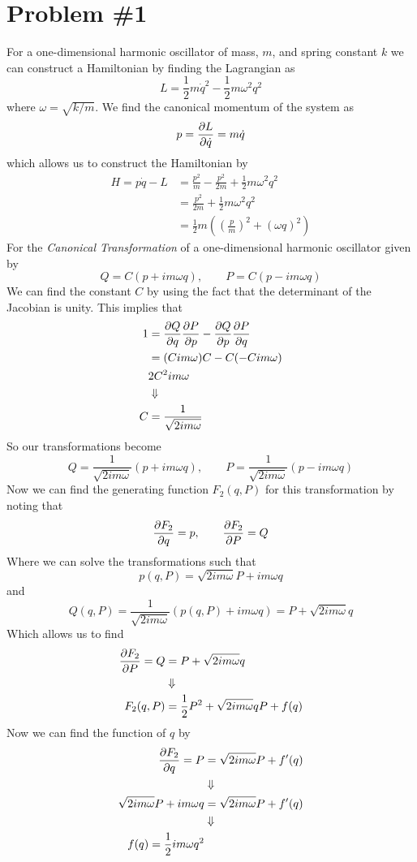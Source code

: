 \documentclass[11pt]{article}
\numberwithin{equation}{section}
\begin{document}


\section{Problem \#1}
For a one-dimensional harmonic oscillator of mass, $m$, and spring constant $k$ we can 
construct a Hamiltonian by finding the Lagrangian as
$$L = \frac{1}{2}m\dot{q}^2 - \frac{1}{2}m\omega^2q^2$$
where $\omega = \sqrt{k/m}$. We find the canonical momentum of the system as
$$p = \frac{\partial{L}}{\partial{\dot{q}}} = m\dot{q}$$
which allows us to construct the Hamiltonian by
\begin{align*}
H = p\dot{q} - L  &= \frac{p^2}{m} - \frac{p^2}{2m} + \frac{1}{2}m\omega^2q^2\\
&= \frac{p^2}{2m} + \frac{1}{2}m\omega^2q^2\\
&= \frac{1}{2}m\left(\left(\frac{p}{m}\right)^2 + (\omega{q})^2\right)
\end{align*}
For the \emph{Canonical Transformation} of a one-dimensional harmonic oscillator given by
$$Q = C(p+im\omega{q}), \qquad P = C(p-im\omega{q})$$
We can find the constant $C$ by using the fact that the determinant of the Jacobian is unity. 
This implies that
\begin{align*}
1 &= \frac{\partial{Q}}{\partial{q}}\frac{\partial{P}}{\partial{p}} - \frac{\partial{Q}}{\partial{p}}\frac{\partial{P}}{\partial{q}}\\
&= (Cim\omega)C - C(-Cim\omega)\\
& 2C^2im\omega\\
&\Downarrow\\
C &= \frac{1}{\sqrt{2im\omega}}
\end{align*}
So our transformations become
$$Q = \frac{1}{\sqrt{2im\omega}}(p+im\omega{q}), \qquad P = \frac{1}{\sqrt{2im\omega}}(p-im\omega{q})$$
Now we can find the generating function $F_2(q,P)$ for this transformation by noting that
$$\frac{\partial{F_2}}{\partial{q}} = p, \qquad \frac{\partial{F_2}}{\partial{P}} = Q$$
Where we can solve the transformations such that
$$p(q,P) = \sqrt{2im\omega}P+im\omega{q}$$
and
$$Q(q,P) = \frac{1}{\sqrt{2im\omega}}(p(q,P)+im\omega{q}) = P +\sqrt{2im\omega}{q}$$
Which allows us to find 
\begin{align*}
\frac{\partial{F_2}}{\partial{P}} = Q  &= P +\sqrt{2im\omega}{q}\\
&\Downarrow\\
F_2(q,P) &= \frac{1}{2}P^2 +\sqrt{2im\omega}{q}P + f(q)
\end{align*}
Now we can find the function of $q$ by
\begin{align*}
\frac{\partial{F_2}}{\partial{q}} = P  &= \sqrt{2im\omega}P + f'(q)\\
&\Downarrow\\
\sqrt{2im\omega}P+im\omega{q} &= \sqrt{2im\omega}P + f'(q)\\
&\Downarrow\\
f(q) = \frac{1}{2}im\omega{q^2}
\end{align*}
\end{document}
